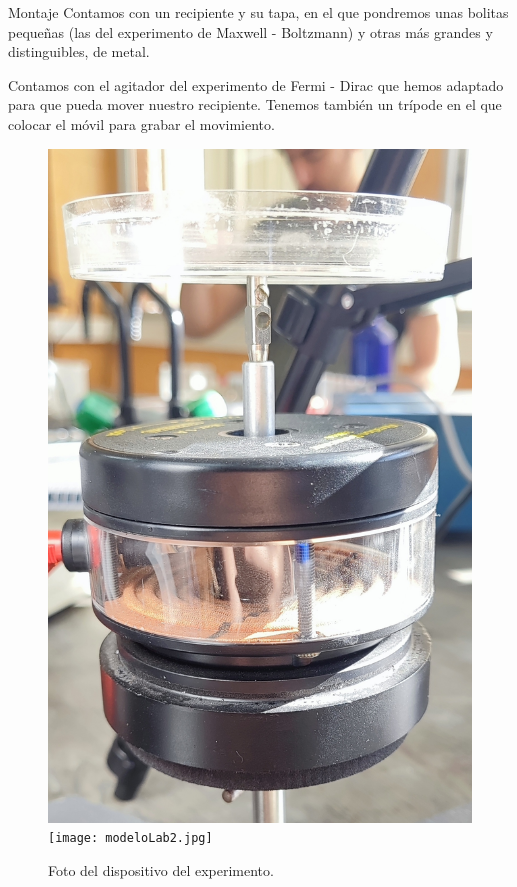 \documentclass{beamer}
\begin{document}
\begin{frame}{Montaje}
Contamos con un recipiente y su tapa, en el que pondremos unas bolitas pequeñas (las del experimento de Maxwell - Boltzmann) y otras más grandes y distinguibles, de metal.

Contamos con el agitador del experimento de Fermi - Dirac que hemos adaptado para que pueda mover nuestro recipiente. Tenemos también un trípode en el que colocar el móvil para grabar el movimiento.

\begin{figure}[h!]
\begin{center}
\includegraphics[scale=0.045]{modeloLab.jpg}
\>
\texttt{[image: modeloLab2.jpg]}
\caption{Foto del dispositivo del experimento.}
\end{center}
\end{figure}
\end{frame}
\end{document}
